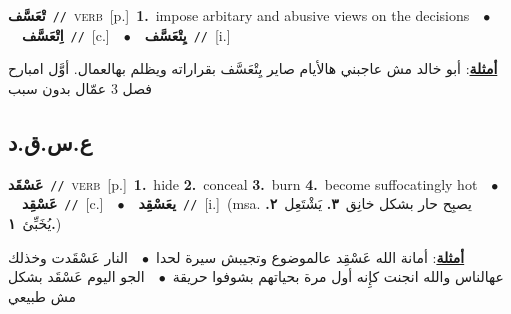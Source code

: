 \documentclass[10pt,a4paper,twoside]{article} %
\begin{document}
\begin{multicols}{2}
{\setlength\topsep{0pt}\textbf{\foreignlanguage{arabic}{تْعَسَّف}}\ {\color{gray}\texttt{//}\color{black}}\ \textsc{verb}\ [p.]\ \textbf{1.}~impose arbitary and abusive views on the decisions\ \ $\bullet$\ \ \setlength\topsep{0pt}\textbf{\foreignlanguage{arabic}{اِتْعَسَّف}}\ {\color{gray}\texttt{//}\color{black}}\ [c.]\ \ $\bullet$\ \ \setlength\topsep{0pt}\textbf{\foreignlanguage{arabic}{يِتْعَسَّف}}\ {\color{gray}\texttt{//}\color{black}}\ [i.]\  \begin{flushright}\color{gray}\foreignlanguage{arabic}{\textbf{\underline{\foreignlanguage{arabic}{أمثلة}}}: أبو خالد مش عاجبني هالأيام صاير يِتْعَسَّف بقراراته ويظلم بهالعمال. أوَّل امبارح فصل 3 عمّال بدون سبب}\end{flushright}\color{black}} \vspace{2mm}

\vspace{-3mm}
\subsection*{\color{blue}\foreignlanguage{arabic}{ع.س.ق.د}\color{blue}{}} 

{\setlength\topsep{0pt}\textbf{\foreignlanguage{arabic}{عَسْقَد}}\ {\color{gray}\texttt{//}\color{black}}\ \textsc{verb}\ [p.]\ \textbf{1.}~hide  \textbf{2.}~conceal  \textbf{3.}~burn  \textbf{4.}~become suffocatingly hot\ \ $\bullet$\ \ \setlength\topsep{0pt}\textbf{\foreignlanguage{arabic}{عَسْقِد}}\ {\color{gray}\texttt{//}\color{black}}\ [c.]\ \ $\bullet$\ \ \setlength\topsep{0pt}\textbf{\foreignlanguage{arabic}{يعَسْقِد}}\ {\color{gray}\texttt{//}\color{black}}\ [i.]\ \color{gray}(msa. \foreignlanguage{arabic}{يصبِح حار بشكل خانِق}~\foreignlanguage{arabic}{\textbf{٣.}}  \foreignlanguage{arabic}{يَشْتَعِل}~\foreignlanguage{arabic}{\textbf{٢.}}  \foreignlanguage{arabic}{يُخَبِّئ}~\foreignlanguage{arabic}{\textbf{١.}})\color{black}\  \begin{flushright}\color{gray}\foreignlanguage{arabic}{\textbf{\underline{\foreignlanguage{arabic}{أمثلة}}}: أمانة الله عَسْقِد عالموضوع وتجيبش سيرة لحدا\ $\bullet$\ \  النار عَسْقَدت وخذلك عهالناس والله انجنت كإِنه أول مرة بحياتهم بشوفوا حريقة\ $\bullet$\ \  الجو اليوم عَسْقَد بشكل مش طبيعي}\end{flushright}\color{black}} \vspace{2mm}


\end{multicols}
\end{document}

